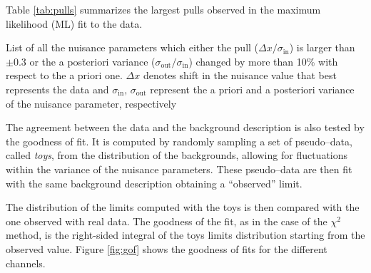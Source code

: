 Table \ref{tab:pulls} summarizes the largest pulls observed in the maximum likelihood (ML) fit to the data.

\begin{table}
\caption{List of all the nuisance parameters which either the pull ($\Delta x/\sigma_{\text{in}}$) is larger than $\pm0.3$ or the a posteriori variance ($\sigma_{\text{out}}/\sigma_{\text{in}}$) changed by more than 10\% with respect to the a priori one. $\Delta x$ denotes shift in the nuisance value that best represents the data and $\sigma_{\text{in}}, \,\sigma_{\text{out}}$ represent the a priori and a posteriori variance of the nuisance parameter, respectively}

\label{tab:pulls}
\end{table}

The agreement between the data and the background description is also tested by the goodness of fit. It is computed by randomly sampling a set of pseudo--data, called \emph{toys}, from the distribution of the backgrounds, allowing for fluctuations within the variance of the nuisance parameters. These pseudo--data are then fit with the same background description obtaining a ``observed'' limit. 

The distribution of the limits computed with the toys is then compared with the one observed with real data. The goodness of the fit, as in the case of the $\chi^2$ method, is the right-sided integral of the toys limits distribution starting from the observed value. Figure \ref{fig:gof} shows the goodness of fits for the different channels.

